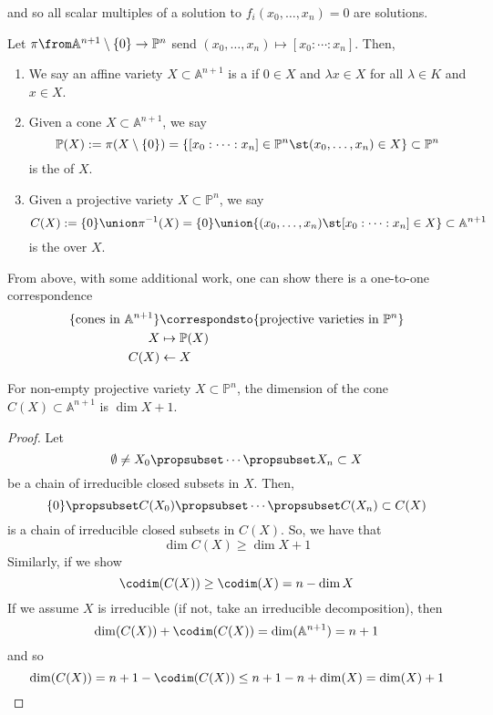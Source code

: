 \documentclass[11pt,leqno,oneside]{amsart}
\numberwithin{thm}{section}
\renewcommand{\P}{\mathbb{P}}
\newcommand{\A}{\mathbb{A}}
\begin{document}
and so all scalar multiples of a solution to \(f_i(x_0, \ldots, x_n) =
0\) are solutions. 
\begin{defn}
  Let \(\pi \from \A^{n+1} \setminus \{0\} \to \P^n\) send \((x_0,
  \ldots, x_n) \mapsto [x_0 : \cdots : x_n]\). Then,
  \begin{enumerate}
  \item We say an affine variety \(X \subset \A^{n+1}\) is a 
    if \(0 \in X\) and \(\lambda x \in X\) for all \(\lambda \in K\)
    and \(x \in X\).
  \item Given a cone \(X \subset \A^{n+1}\), we say \[
      \P(X) := \pi(X \setminus \{0\}) = \{[x_0 : \cdots : x_n] \in
      \P^n \st (x_0, \ldots, x_n) \in X\} \subset \P^n
    \]
    is the  of \(X\).
  \item Given a projective variety \(X \subset \P^n\), we say \[
      C(X) := \{0\} \union \pi^{-1}(X) = \{0\} \union \{(x_0, \ldots,
      x_n) \st [x_0 : \cdots : x_n] \in X\} \subset \A^{n+1}
    \]
    is the  over \(X\).
  \end{enumerate}
\end{defn}
\begin{rmk}
  From above, with some additional work, one can show there is a
  one-to-one correspondence
  \begin{align*}
    \{\text{cones in }\A^{n+1}\} & \correspondsto \{\text{projective
    varieties in }\P^n\}\\
    X & \mapsto \P(X)\\
    C(X) & \leftarrow X
  \end{align*}
\end{rmk}
\begin{lem}
  For non-empty projective variety \(X \subset \P^n\), the dimension
  of the cone \(C(X) \subset \A^{n+1}\)  is \(\dim X + 1\).
\end{lem}
\begin{proof}
  Let \[
    \emptyset \neq X_0 \propsubset \cdots \propsubset X_n \subset X
  \]
  be a chain of irreducible closed subsets in \(X\). Then, \[
    \{0\} \propsubset C(X_0) \propsubset \cdots \propsubset C(X_n)
    \subset C(X)
  \]
  is a chain of irreducible closed subsets in \(C(X)\). So, we have
  that \[
    \dim C(X) \geq \dim X + 1
  \]
  Similarly, if we show  \[
    \codim(C(X)) \geq \codim(X) = n - \dim X
  \]
  If we assume \(X\) is irreducible (if not, take an irreducible
  decomposition), then \[
    \dim(C(X))+ \codim(C(X)) = \dim(\A^{n+1}) = n+1
  \]
  and so \[
    \dim(C(X)) = n+1 - \codim(C(X)) \leq n+1-n+\dim(X) = \dim(X)+1
  \]
\end{proof}
\end{document}
